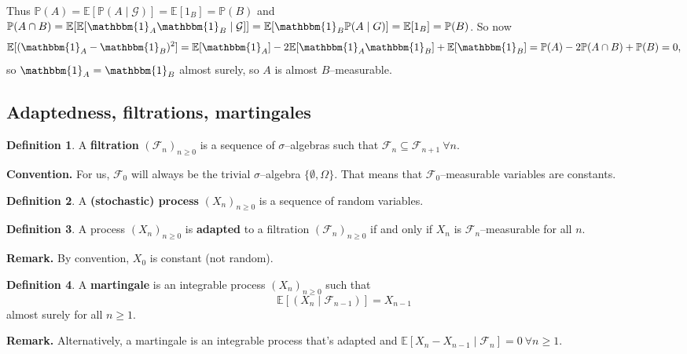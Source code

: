 \documentclass{article}
\theoremstyle{definition}
\newtheorem{defn}{Definition}[section]
\begin{document}
Thus $\mathbb{P}(A)= \mathbb{E}[\mathbb{P}(A \mid \mathcal{G})] = \mathbb{E}[1_B]=\mathbb{P}(B)$ and $\mathbb{P}(A \cap B) = \mathbb{E}[\mathbb{E}[\mathbbm{1}_A \mathbbm{1}_B \mid \mathcal{G}]] = \mathbb{E}[\mathbbm{1}_B \mathbb{P}(A \mid G)] = \mathbb{E}[1_B] = \mathbb{P}(B)$. So now 
\[
\mathbb{E}[(\mathbbm{1}_A - \mathbbm{1}_B)^2] = \mathbb{E}[\mathbbm{1}_A] - 2\mathbb{E}[\mathbbm{1}_A \mathbbm{1}_B] + \mathbb{E}[\mathbbm{1}_B] = \mathbb{P}(A) - 2 \mathbb{P}(A \cap B) + \mathbb{P}(B) = 0,
\]
so $\mathbbm{1}_A = \mathbbm{1}_B$ almost surely, so $A$ is almost $B$--measurable.

\subsection{Adaptedness, filtrations, martingales}

\begin{defn}
    A \textbf{filtration} $(\mathcal{F}_n)_{n\ge 0}$ is a sequence of $\sigma$--algebras such that $\mathcal{F}_n \subseteq \mathcal{F}_{n+1} ~\forall n$.
\end{defn}
\textbf{Convention.} For us, $\mathcal{F}_0$ will always be the trivial $\sigma$--algebra $\{\emptyset, \Omega\}$. That means that $\mathcal{F}_0$--measurable variables are constants.

\begin{defn}
    A \textbf{(stochastic) process} $(X_n)_{n\ge 0}$ is a sequence of random variables.
\end{defn}
\begin{defn}
    A process $(X_n)_{n\ge 0}$ is \textbf{adapted} to a filtration $(\mathcal{F}_n)_{n\ge 0}$ if and only if $X_n$ is $\mathcal{F}_n$--measurable for all $n$.
\end{defn}
\textbf{Remark.} By convention, $X_0$ is constant (not random).

\begin{defn}
    A \textbf{martingale} is an integrable process $(X_n)_{n\ge 0}$ such that $$\mathbb{E}[(X_n \mid \mathcal{F}_{n-1})] = X_{n-1}$$ almost surely for all $n\ge 1$.
\end{defn}
\textbf{Remark.} Alternatively, a martingale is an integrable process that's adapted and $\mathbb{E}[X_n - X_{n-1} \mid \mathcal{F}_n] = 0 ~\forall n\ge 1$.
\end{document}
